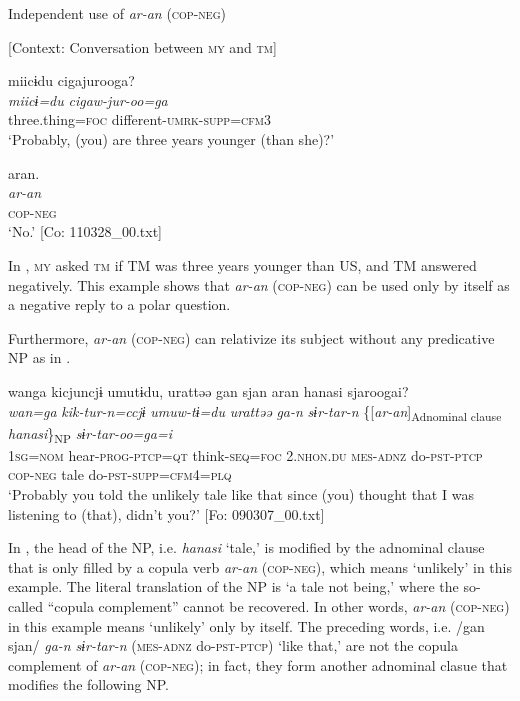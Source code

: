 \ea\label{ex:8-40}
  Independent use of \textit{ar-an} (\textsc{cop}-\textsc{neg})

  [Context: Conversation between \textsc{my} and \textsc{tm}]

{\MY}
\glll  miicɨdu  cigajurooga?\\
    \textit{miicɨ=du}  \textit{cigaw-jur-oo=ga}\\
    three.thing=\textsc{foc}  different-\textsc{umrk}-\textsc{supp}=\textsc{cfm3}\\
\glt ‘Probably, (you) are three years younger (than she)?’

  {\TM}
\glll  aran.\\
\textit{ar-an}\\
    \textsc{cop}-\textsc{neg}\\
\glt ‘No.’ [Co: 110328\_00.txt]
\z

In , \textsc{my} asked \textsc{tm} if TM was three years younger than US, and TM answered negatively. This example shows that \textit{ar-an} (\textsc{cop}-\textsc{neg}) can be used only by itself as a negative reply to a polar question.

  Furthermore, \textit{ar-an} (\textsc{cop}-\textsc{neg}) can relativize its subject without any predicative NP as in .

\ea\label{ex:8-41}
  {\TM}
\glll  wanga  kicjuncjɨ  umutɨdu,  urattəə   gan  sjan  aran  hanasi  sjaroogai?\\
\textit{wan=ga}  \textit{kik-tur-n=ccjɨ}  \textit{umuw-tɨ=du}  \textit{urattəə}   \textit{ga-n}  \textit{sɨr-tar-n}  \{[\textit{ar-an}]\textsubscript{Adnominal clause}  \textit{hanasi}\}\textsubscript{NP}  \textit{sɨr-tar-oo=ga=i}\\
    1\textsc{sg}=\textsc{nom}  hear-\textsc{prog}-\textsc{ptcp}=\textsc{qt}  think-\textsc{seq}=\textsc{foc}  2.\textsc{nhon}.\textsc{du}  \textsc{mes}-\textsc{adnz}  do-\textsc{pst}-\textsc{ptcp}  \textsc{cop}-\textsc{neg}  tale  do-\textsc{pst}-\textsc{supp}=\textsc{cfm}4=\textsc{plq}\\
\glt ‘Probably you told the unlikely tale like that since (you) thought that I was listening to (that), didn’t you?’ [Fo: 090307\_00.txt]
\z

In , the head of the NP, i.e. \textit{hanasi} ‘tale,’ is modified by the adnominal clause that is only filled by a copula verb \textit{ar-an} (\textsc{cop}-\textsc{neg}), which means ‘unlikely’ in this example. The literal translation of the NP is ‘a tale not being,’ where the so-called “copula complement” cannot be recovered. In other words, \textit{ar-an} (\textsc{cop}-\textsc{neg}) in this example means ‘unlikely’ only by itself. The preceding words, i.e. /gan sjan/ \textit{ga-n} \textit{sɨr-tar-n} (\textsc{mes}-\textsc{adnz} do-\textsc{pst}-\textsc{ptcp}) ‘like that,’ are not the copula complement of \textit{ar-an} (\textsc{cop}-\textsc{neg}); in fact, they form another adnominal clasue that modifies the following NP.

